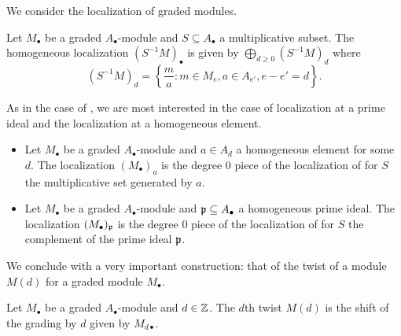 We consider the localization of graded modules. 
\begin{definition}\label{def: homogeneous localization of modules}
    Let $M_{\bullet}$ be a graded $A_{\bullet}$-module and $S\subseteq A_{\bullet}$ a multiplicative subset. The homogeneous localization $(S^{-1}M)_{\bullet}$ is given by $\bigoplus_{d\geq0}(S^{-1}M)_{d}$ where 
    $$(S^{-1}M)_{d}=\left\{\frac{m}{a}:m\in M_{e},a\in A_{e'}, e-e'=d\right\}.$$
\end{definition}
As in the case of , we are most interested in the case of localization at a prime ideal and the localization at a homogeneous element. 
\begin{itemize}
    \item Let $M_{\bullet}$ be a graded $A_{\bullet}$-module and $a\in A_{d}$ a homogeneous element for some $d$. The localization $(M_{\bullet})_{a}$ is the degree 0 piece of the localization of  for $S$ the multiplicative set generated by $a$. 
    \item Let $M_{\bullet}$ be a graded $A_{\bullet}$-module and $\mathfrak{p}\subseteq A_{\bullet}$ a homogeneous prime ideal. The localization $(M_{\bullet})_{\mathfrak{p}}$ is the degree 0 piece of the localization of  for $S$ the complement of the prime ideal $\mathfrak{p}$. 
\end{itemize}
We conclude with a very important construction: that of the twist of a module $M(d)$ for a graded module $M_{\bullet}$. 
\begin{definition}
    Let $M_{\bullet}$ be a graded $A_{\bullet}$-module and $d\in\mathbb{Z}$. The $d$th twist $M(d)$ is the shift of the grading by $d$ given by $M_{d\bullet}$. 
\end{definition}